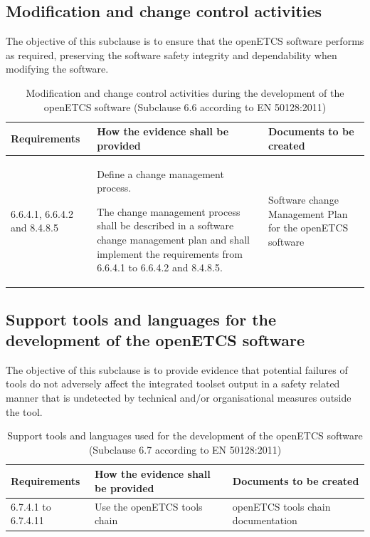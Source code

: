 \documentclass{template/openetcs_report}
\begin{document}
\subsection{Modification and change control activities}
\begin{flushleft}
The objective of this subclause is to ensure that the openETCS software performs as required, preserving the software safety integrity and dependability when modifying the software.
\end{flushleft}
{\footnotesize\sffamily\centering
\begin{longtable}{|p{2cm}|p{9cm}|p{3cm}|}
\caption{Modification and change control activities during the development of the openETCS software (Subclause 6.6 according to EN 50128:2011)}\\
\hline
\bfseries Requirements & \bfseries How the evidence shall be provided & \bfseries Documents to be created\\
\hline
\hline
\endhead
\hline
\endfoot

6.6.4.1, 6.6.4.2 and 8.4.8.5 & Define a change management process.

The change management process shall be described in a  software change management plan and shall implement the requirements from 6.6.4.1 to 6.6.4.2 and 8.4.8.5.
& Software change Management Plan for the openETCS software\\ 
\hline
\end{longtable}}


\subsection{Support tools and languages for the development of the openETCS software}
\begin{flushleft}
The objective of this subclause is to provide evidence that potential failures of tools do not adversely affect the integrated toolset output in a safety related manner that is undetected by technical and/or organisational measures outside the tool.
\end{flushleft}
{\footnotesize\sffamily\centering
\begin{longtable}{|p{2cm}|p{9cm}|p{3cm}|}
\caption{Support tools and languages used for the development of the openETCS software  (Subclause 6.7 according to EN 50128:2011)}\\
\hline
\bfseries Requirements & \bfseries How the evidence shall be provided & \bfseries Documents to be created\\
\hline
\hline
\endhead
\hline
\endfoot

6.7.4.1 to 6.7.4.11 & Use the openETCS tools chain & openETCS tools chain documentation\\ 
\hline
\end{longtable}}
\end{document}
